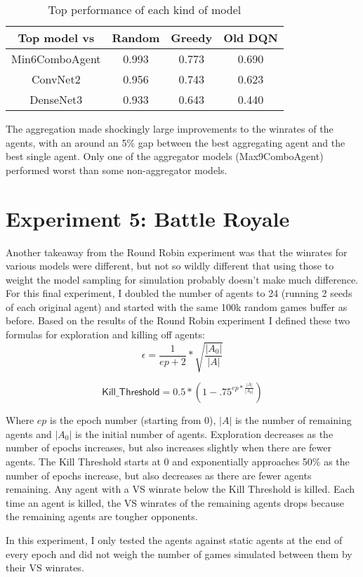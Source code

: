 \documentclass{article}
\newcommand{\beginTable}[2]{
\begin{table}[t]
\caption{#1}
\vskip 0.15in
\begin{center}
\begin{small}
\begin{sc}
\begin{tabular}{#2}
\toprule
}
\newcommand{\finTable}{
\bottomrule
\end{tabular}
\end{sc}
\end{small}
\end{center}
\vskip -0.1in
\end{table}
}
\begin{document}
\beginTable{Top performance of each kind of model}{cccc}
Top model vs & Random & Greedy & Old DQN\\
\midrule
Min6ComboAgent & 0.993 & 0.773 & 0.690\\
ConvNet2 & 0.956 & 0.743 & 0.623\\
DenseNet3 & 0.933 & 0.643 & 0.440\\
\finTable

The aggregation made shockingly large improvements to the winrates of the agents, with an around an 5\% gap between the best aggregating agent and the best single agent. Only one of the aggregator models (Max9ComboAgent) performed worst than some non-aggregator models.

\section{Experiment 5: Battle Royale}
Another takeaway from the Round Robin experiment was that the winrates for various models were different, but not so wildly different that using those to weight the model sampling for simulation probably doesn't make much difference. For this final experiment, I doubled the number of agents to 24 (running 2 seeds of each original agent) and started with the same 100k random games buffer as before. Based on the results of the Round Robin experiment I defined these two formulas for exploration and killing off agents:\\

$$\epsilon = \frac{1}{ep+2} * \sqrt{\frac{|A_0|}{|A|}}$$

$$\textsf{Kill\_Threshold} = 0.5*(1-.75^{ep*\frac{|A|}{|A_0|}})$$

Where $ep$ is the epoch number (starting from 0), $|A|$ is the number of remaining agents and $|A_0|$ is the initial number of agents. Exploration decreases as the number of epochs increases, but also increases slightly when there are fewer agents. The Kill Threshold starts at 0 and exponentially approaches 50\% as the number of epochs increase, but also decreases as there are fewer agents remaining. Any agent with a VS winrate below the Kill Threshold is killed. Each time an agent is killed, the VS winrates of the remaining agents drops because the remaining agents are tougher opponents.

In this experiment, I only tested the agents against static agents at the end of every epoch and did not weigh the number of games simulated between them by their VS winrates.
\end{document}
